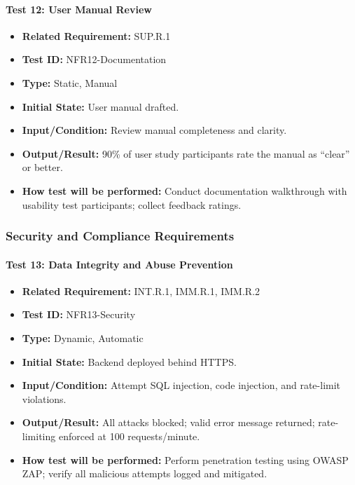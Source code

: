 \documentclass[12pt, titlepage]{article}
\begin{document}
\paragraph{Test 12: User Manual Review}
\begin{itemize}
    \item \textbf{Related Requirement:} SUP.R.1
    \item \textbf{Test ID:} NFR12-Documentation
    \item \textbf{Type:} Static, Manual
    \item \textbf{Initial State:} User manual drafted.
    \item \textbf{Input/Condition:} Review manual completeness and clarity.
    \item \textbf{Output/Result:} 90\% of user study participants rate the manual as “clear” or better.
    \item \textbf{How test will be performed:} Conduct documentation walkthrough with usability test participants; collect feedback ratings.
\end{itemize}

\subsubsection{Security and Compliance Requirements}

\paragraph{Test 13: Data Integrity and Abuse Prevention}
\begin{itemize}
    \item \textbf{Related Requirement:} INT.R.1, IMM.R.1, IMM.R.2
    \item \textbf{Test ID:} NFR13-Security
    \item \textbf{Type:} Dynamic, Automatic
    \item \textbf{Initial State:} Backend deployed behind HTTPS.
    \item \textbf{Input/Condition:} Attempt SQL injection, code injection, and rate-limit violations.
    \item \textbf{Output/Result:} All attacks blocked; valid error message returned; rate-limiting enforced at 100 requests/minute.
    \item \textbf{How test will be performed:} Perform penetration testing using OWASP ZAP; verify all malicious attempts logged and mitigated.
\end{itemize}
\end{document}
